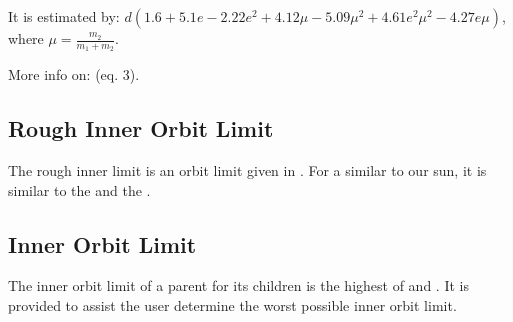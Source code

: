 \documentclass[letterpaper,10pt,english]{sphinxmanual}
\begin{document}
\sphinxAtStartPar
It is estimated by: \(d(1.6 + 5.1 e - 2.22 e^2 + 4.12 \mu - 5.09 \mu^2 + 4.61 e^2  \mu^2 - 4.27 e \mu)\),
where \(\mu = \frac{m_2}{m_1 + m_2}\).

\sphinxAtStartPar
More info on:  (eq. 3).


\subsection{Rough Inner Orbit Limit}
\label{\detokenize{quantities/children_orbit_limits/rough_inner_orbit_limit:rough-inner-orbit-limit}}\label{\detokenize{quantities/children_orbit_limits/rough_inner_orbit_limit::doc}}
\sphinxAtStartPar
The rough inner limit is an orbit limit given in .
For a {\hyperref[\detokenize{celestial_bodies/star:id1}]{}} similar to our sun, it is similar to the {\hyperref[\detokenize{quantities/children_orbit_limits/dense_roche_limit:id1}]{}}
and the {\hyperref[\detokenize{quantities/children_orbit_limits/outer_rock_formation_limit:id1}]{}}.


\subsection{Inner Orbit Limit}
\label{\detokenize{quantities/children_orbit_limits/inner_orbit_limit:inner-orbit-limit}}\label{\detokenize{quantities/children_orbit_limits/inner_orbit_limit::doc}}\label{\detokenize{quantities/children_orbit_limits/inner_orbit_limit:id1}}
\sphinxAtStartPar
The inner orbit limit of a parent for its children is the highest of
{\hyperref[\detokenize{quantities/children_orbit_limits/dense_roche_limit:id1}]{}} and {\hyperref[\detokenize{quantities/children_orbit_limits/p_type_critical_orbit:p-type-critical-orbit}]{}}.
It is provided to assist the user determine the worst possible inner orbit limit.
\end{document}
